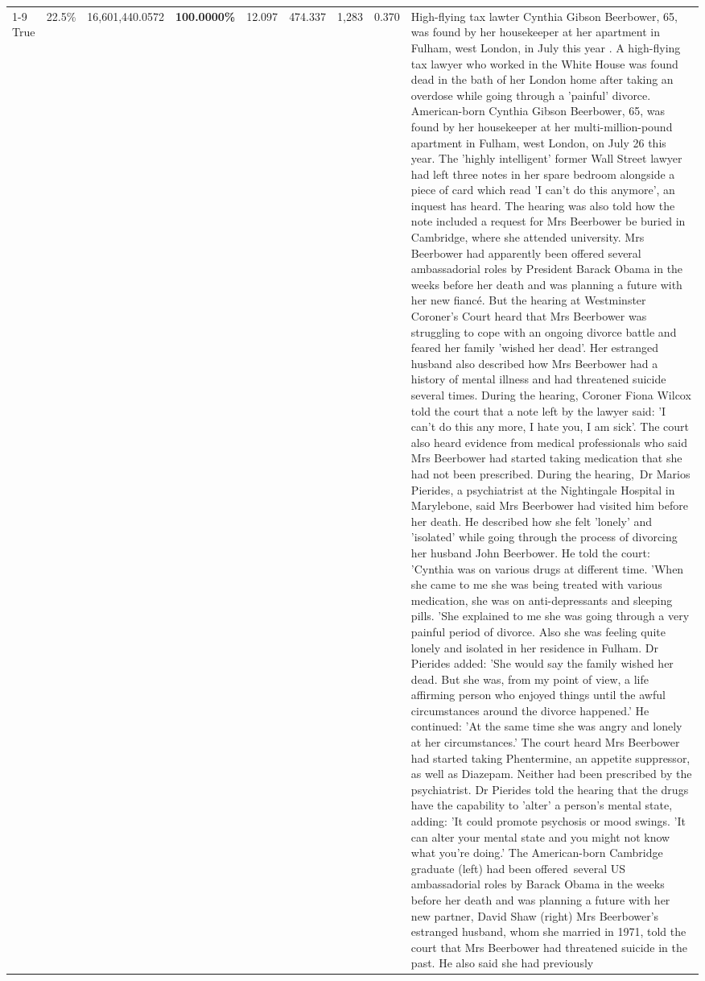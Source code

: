 \begin{table}[H]
\begin{tabular}{lllrlllll}
\cline{1-9}
True & 22.5\% & 16,601,440.0572 & \bfseries \color{red} 100.0000\% & 12.097 & 474.337 & 1,283 & 0.370 & High-flying tax lawter Cynthia Gibson Beerbower, 65, was found by her housekeeper at her apartment in Fulham, west London, in July this year . A high-flying tax lawyer who worked in the White House was found dead in the bath of her London home after taking an overdose while going through a 'painful' divorce. American-born Cynthia Gibson Beerbower, 65, was found by her housekeeper at her multi-million-pound apartment in Fulham, west London, on July 26 this year. The 'highly intelligent' former Wall Street lawyer had left three notes in her spare bedroom alongside a piece of card which read 'I can't do this anymore', an inquest has heard. The hearing was also told how the note included a request for Mrs Beerbower be buried in Cambridge, where she attended university. Mrs Beerbower had apparently been offered several ambassadorial roles by President Barack Obama in the weeks before her death and was planning a future with her new fiancé. But the hearing at Westminster Coroner's Court heard that Mrs Beerbower was struggling to cope with an ongoing divorce battle and feared her family 'wished her dead'. Her estranged husband also described how Mrs Beerbower had a history of mental illness and had threatened suicide several times. During the hearing, Coroner Fiona Wilcox told the court that a note left by the lawyer said: 'I can't do this any more, I hate you, I am sick'. The court also heard evidence from medical professionals who said Mrs Beerbower had started taking medication that she had not been prescribed. During the hearing, Dr Marios Pierides, a psychiatrist at the Nightingale Hospital in Marylebone, said Mrs Beerbower had visited him before her death. He described how she felt 'lonely' and 'isolated' while going through the process of divorcing her husband John Beerbower. He told the court: 'Cynthia was on various drugs at different time. 'When she came to me she was being treated with various medication, she was on anti-depressants and sleeping pills. 'She explained to me she was going through a very painful period of divorce. Also she was feeling quite lonely and isolated in her residence in Fulham. Dr Pierides added: 'She would say the family wished her dead. But she was, from my point of view, a life affirming person who enjoyed things until the awful circumstances around the divorce happened.' He continued: 'At the same time she was angry and lonely at her circumstances.' The court heard Mrs Beerbower had started taking Phentermine, an appetite suppressor, as well as Diazepam. Neither had been prescribed by the psychiatrist. Dr Pierides told the hearing that the drugs have the capability to 'alter' a person's mental state, adding: 'It could promote psychosis or mood swings. 'It can alter your mental state and you might not know what you're doing.' The American-born Cambridge graduate (left) had been offered several US ambassadorial roles by Barack Obama in the weeks before her death and was planning a future with her new partner, David Shaw (right) Mrs Beerbower's estranged husband, whom she married in 1971, told the court that Mrs Beerbower had threatened suicide in the past. He also said she had previously 
\end{tabular}
\end{table}
